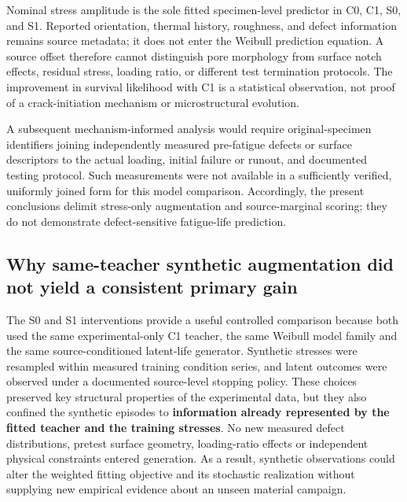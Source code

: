 \documentclass[12pt,a4paper]{article}
\begin{document}
Nominal stress amplitude is the sole fitted specimen-level predictor in C0, C1, S0, and S1. Reported orientation, thermal history, roughness, and defect information remains source metadata; it does not enter the Weibull prediction equation. A source offset therefore cannot distinguish pore morphology from surface notch effects, residual stress, loading ratio, or different test termination protocols. The improvement in survival likelihood with C1 is a statistical observation, not proof of a crack-initiation mechanism or microstructural evolution.

A subsequent mechanism-informed analysis would require original-specimen identifiers joining independently measured pre-fatigue defects or surface descriptors to the actual loading, initial failure or runout, and documented testing protocol. Such measurements were not available in a sufficiently verified, uniformly joined form for this model comparison. Accordingly, the present conclusions delimit stress-only augmentation and source-marginal scoring; they do not demonstrate defect-sensitive fatigue-life prediction.

\subsection{Why same-teacher synthetic augmentation did not yield a consistent primary gain}

The S0 and S1 interventions provide a useful controlled comparison because both used the same experimental-only C1 teacher, the same Weibull model family and the same source-conditioned latent-life generator. Synthetic stresses were resampled within measured training condition series, and latent outcomes were observed under a documented source-level stopping policy. These choices preserved key structural properties of the experimental data, but they also confined the synthetic episodes to \textbf{information already represented by the fitted teacher and the training stresses}. No new measured defect distributions, pretest surface geometry, loading-ratio effects or independent physical constraints entered generation. As a result, synthetic observations could alter the weighted fitting objective and its stochastic realization without supplying new empirical evidence about an unseen material campaign.
\end{document}
